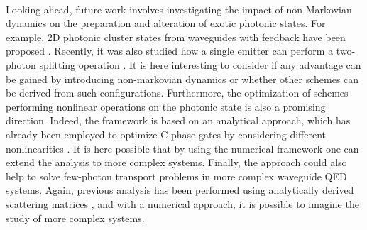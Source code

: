 \

Looking ahead, future work involves investigating the impact of non-Markovian dynamics on the preparation and alteration of exotic photonic states.  For example, 2D photonic cluster states from waveguides with feedback have been proposed \cite{Pichler2016PhotonicFeedback}. Recently, it was also studied how a single emitter can perform a two-photon splitting operation \cite{Lund2023PerfectPulse}. It is here interesting to consider if any advantage can be gained by introducing non-markovian dynamics or whether other schemes can be derived from such configurations. Furthermore, the optimization of schemes performing nonlinear operations on the photonic state is also a promising direction. Indeed, the framework is based on an analytical approach, which has already been employed to optimize C-phase gates by considering different nonlinearities \cite{Heuck2020Photon-photonCavities,Heuck2020Controlled-PhaseNonlinearities,Krastanov2022Controlled-phaseEmitter}. It is here possible that by using the numerical framework one can extend the analysis to more complex systems. Finally, the approach could also help to solve few-photon transport problems in more complex waveguide QED systems. Again, previous analysis has been performed using analytically derived scattering matrices \cite{Joanesarson2020Few-photonGeometries}, and with a numerical approach, it is possible to imagine the study of more complex systems.

